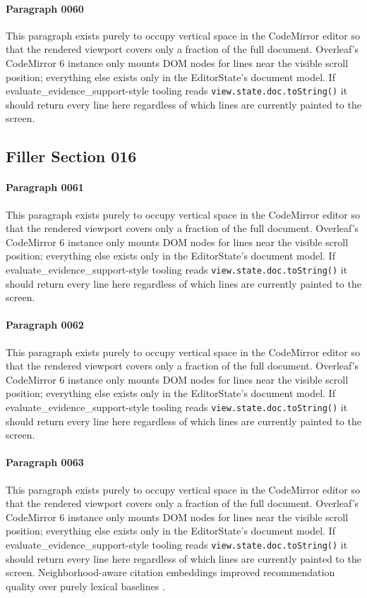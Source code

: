 \documentclass{article}
\begin{document}
\paragraph{Paragraph 0060}
This paragraph exists purely to occupy vertical space in the CodeMirror editor so that the rendered viewport covers only a fraction of the full document. Overleaf's CodeMirror 6 instance only mounts DOM nodes for lines near the visible scroll position; everything else exists only in the EditorState's document model. If evaluate\_evidence\_support-style tooling reads \texttt{view.state.doc.toString()} it should return every line here regardless of which lines are currently painted to the screen.

\subsection{Filler Section 016}
\paragraph{Paragraph 0061}
This paragraph exists purely to occupy vertical space in the CodeMirror editor so that the rendered viewport covers only a fraction of the full document. Overleaf's CodeMirror 6 instance only mounts DOM nodes for lines near the visible scroll position; everything else exists only in the EditorState's document model. If evaluate\_evidence\_support-style tooling reads \texttt{view.state.doc.toString()} it should return every line here regardless of which lines are currently painted to the screen.

\paragraph{Paragraph 0062}
This paragraph exists purely to occupy vertical space in the CodeMirror editor so that the rendered viewport covers only a fraction of the full document. Overleaf's CodeMirror 6 instance only mounts DOM nodes for lines near the visible scroll position; everything else exists only in the EditorState's document model. If evaluate\_evidence\_support-style tooling reads \texttt{view.state.doc.toString()} it should return every line here regardless of which lines are currently painted to the screen.

\paragraph{Paragraph 0063}
This paragraph exists purely to occupy vertical space in the CodeMirror editor so that the rendered viewport covers only a fraction of the full document. Overleaf's CodeMirror 6 instance only mounts DOM nodes for lines near the visible scroll position; everything else exists only in the EditorState's document model. If evaluate\_evidence\_support-style tooling reads \texttt{view.state.doc.toString()} it should return every line here regardless of which lines are currently painted to the screen. Neighborhood-aware citation embeddings improved recommendation quality over purely lexical baselines \citep{martins2018citation}.
\end{document}
